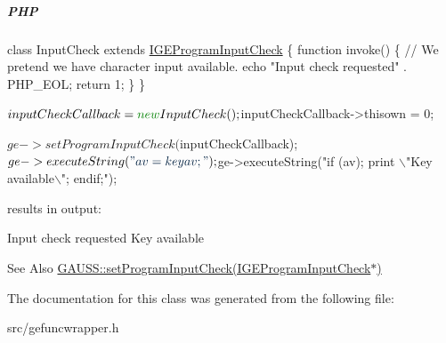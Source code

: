 \subparagraph*{P\-H\-P}


\begin{DoxyCode}
\textcolor{keyword}{class }InputCheck \textcolor{keyword}{extends} \hyperlink{class_i_g_e_program_input_check}{IGEProgramInputCheck} \{
    \textcolor{keyword}{function} invoke() \{
        \textcolor{comment}{// We pretend we have character input available.}
        echo \textcolor{stringliteral}{"Input check requested"} . PHP\_EOL;
        \textcolor{keywordflow}{return} 1;
    \}
\}

$inputCheckCallback = \textcolor{keyword}{new} InputCheck();
$inputCheckCallback->thisown = 0;

$ge->setProgramInputCheck($inputCheckCallback);
$ge->executeString(\textcolor{stringliteral}{"av = keyav;"});
$ge->executeString(\textcolor{stringliteral}{"if (av); print \(\backslash\)"Key available\(\backslash\)"; endif;"});
\end{DoxyCode}
 results in output\-: 
\begin{DoxyCode}
Input check requested
Key available
\end{DoxyCode}


\begin{DoxySeeAlso}{See Also}
\hyperlink{class_g_a_u_s_s_a6517b404cf71d157808a1cb73e3c0ddb}{G\-A\-U\-S\-S\-::set\-Program\-Input\-Check(\-I\-G\-E\-Program\-Input\-Check$\ast$)} 
\end{DoxySeeAlso}


The documentation for this class was generated from the following file\-:\begin{DoxyCompactItemize}
\item 
src/gefuncwrapper.\-h\end{DoxyCompactItemize}
